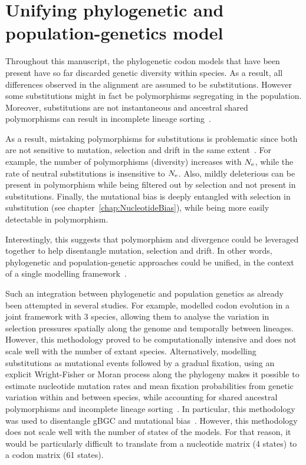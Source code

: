 \section{Unifying phylogenetic and population-genetics model}
\label{sec:unifying-phylogenetic-and-population-genetics-model}

Throughout this manuscript, the phylogenetic codon models that have been present have so far discarded genetic diversity within species.
As a result, all differences observed in the alignment are assumed to be substitutions.
However some substitutions might in fact be polymorphisms segregating in the population.
Moreover, substitutions are not instantaneous and ancestral shared polymorphisms can result in incomplete lineage sorting~\citep{Charlesworth2010}.

As a result, mistaking polymorphisms for substitutions is problematic since both are not sensitive to mutation, selection and drift in the same extent~\citep{Mugal2014}.
For example, the number of polymorphisms (diversity) increases with $N_{\textrm{e}}$, while the rate of neutral substitutions is insensitive to $N_{\textrm{e}}$.
Also, mildly deleterious can be present in polymorphism while being filtered out by selection and not present in substitutions.
Finally, the mutational bias is deeply entangled with selection in substitution (see chapter~\ref{chap:NucleotideBias}), while being more easily detectable in polymorphism.

Interestingly, this suggests that polymorphism and divergence could be leveraged together to help disentangle mutation, selection and drift.
In other words, phylogenetic and population-genetic approaches could be unified, in the context of a single modelling framework~\citep{Thorne2012}.

Such an integration between phylogenetic and population genetics as already been attempted in several studies.
For example, \citet{Wilson2011} modelled codon evolution in a joint framework with $3$ species, allowing them to analyse the variation in selection pressures spatially along the genome and temporally between lineages.
However, this methodology proved to be computationally intensive and does not scale well with the number of extant species.
Alternatively, modelling substitutions as mutational events followed by a gradual fixation, using an explicit Wright-Fisher or Moran process along the phylogeny makes it possible to estimate nucleotide mutation rates and mean fixation probabilities from genetic variation within and between species, while accounting for shared ancestral polymorphisms and incomplete lineage sorting~\citep{DeMaio2013, Schrempf2016, Bergman2018, Schrempf2019}.
In particular, this methodology was used to disentangle gBGC and mutational bias~\citep{Borges2019, Borges2020}.
However, this methodology does not scale well with the number of states of the models.
For that reason, it would be particularly difficult to translate from a nucleotide matrix (4 states) to a codon matrix (61 states).

